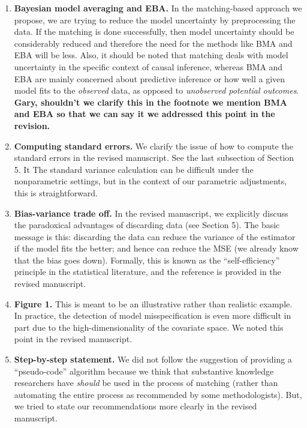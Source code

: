 \documentclass[11pt]{article}
\begin{document}
\begin{enumerate}
\item {\bf Bayesian model averaging and EBA.} In the matching-based
  approach we propose, we are trying to reduce the model uncertainty
  by preprocessing the data. If the matching is done successfully,
  then model uncertainty should be considerably reduced and therefore
  the need for the methods like BMA and EBA will be less. Also, it
  should be noted that matching deals with model uncertainty in the
  specific context of causal inference, whereas BMA and EBA are mainly
  concerned about predictive inference or how well a given model fits
  to the {\it observed} data, as opposed to {\it unobserved potential
    outcomes}.  {\bf Gary, shouldn't we clarify this in the footnote
    we mention BMA and EBA so that we can say it we addressed this
    point in the revision.}

\item {\bf Computing standard errors.} We clarify the issue of how to
  compute the standard errors in the revised manuscript. See the last
  subsection of Section 5. It The standard variance calculation can be
  difficult under the nonparametric settings, but in the context of
  our parametric adjustments, this is straightforward.

\item {\bf Bias-variance trade off.} In the revised manuscript, we
  explicitly discuss the paradoxical advantages of discarding data
  (see Section 5). The basic message is this: discarding the data can
  reduce the variance of the estimator if the model fits the better;
  and hence can reduce the MSE (we already know that the bias goes
  down).  Formally, this is known as the ``self-efficiency'' principle
  in the statistical literature, and the reference is provided in the
  revised manuscript.

\item {\bf Figure 1.} This is meant to be an illustrative rather than
  realistic example. In practice, the detection of model
  misspecification is even more difficult in part due to the
  high-dimensionality of the covariate space.  We noted this point in
  the revised manuscript.

\item {\bf Step-by-step statement.} We did not follow the suggestion
  of providing a ``pseudo-code'' algorithm because we think that
  substantive knowledge researchers have {\it should} be used in the
  process of matching (rather than automating the entire process as
  recommended by some methodologists). But, we tried to state our
  recommendations more clearly in the revised manuscript.


\end{enumerate}
\end{document}
